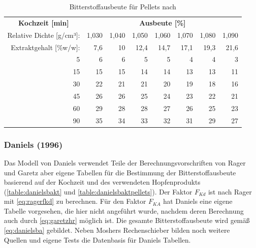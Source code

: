 \documentclass[a4paper,parskip=half]{scrartcl}
\newcommand{\FKd}{F_{\mathit{Kd}}}
\newcommand{\FHR}{F_{\mathit{KA}}}
\begin{document}
\begin{table}[H]
\centering
\begin{tabular}{rrrrrrrr} 
\toprule
\multicolumn{1}{c}{\textbf{Kochzeit [min]}} & \multicolumn{7}{c}{\textbf{Ausbeute [\%]}}  \\
Relative Dichte [g/cm³]:                                        & 1,030 & 1,040 & 1,050 & 1,060 & 1,070 & 1,080  & 1,090                   \\
Extraktgehalt [\%w/w]:                                            & 7,6 & 10 & 12,4 & 14,7 & 17,1 & 19,3  & 21,6                   \\  
\midrule
5                                            & 6     & 6     & 5     & 5     & 4     & 4      & 3                          \\
15                                           & 15    & 15    & 14    & 14    & 13    & 13     & 11                         \\
30                                           & 22    & 21    & 21    & 20    & 19    & 18     & 16                         \\
45                                           & 26    & 26    & 25    & 24    & 23    & 22     & 21                         \\
60                                           & 29    & 28    & 28    & 27    & 26    & 25     & 23                         \\
90                                           & 35    & 34    & 33    & 32    & 31    & 29     & 27                         \\
\bottomrule
\end{tabular}
\caption{Bitterstoffausbeute für Pellets nach \citeauthor{Mosher1994} \parencite[51]{Holle2010}}
\label{table:mosherbaktpellets}
\end{table}

\subsubsection*{Daniels (1996)}

Das Modell von Daniels verwendet Teile der Berechnungsvorschriften von Rager und Garetz aber eigene Tabellen für die Bestimmung der Bitterstoffausbeute basierend auf der Kochzeit und des verwendeten Hopfenprodukts (\autoref{table:danielsbakt} und \autoref{table:danielsbaktpellets}). Der Faktor $\FKd$ ist nach Rager mit \autoref{eq:ragerfkd} zu berechnen. Für den Faktor $\FHR$ hat Daniels eine eigene Tabelle vorgesehen, die hier nicht angeführt wurde, nachdem deren Berechnung auch durch \autoref{eq:garetzhr} möglich ist. Die gesamte Bitterstoffausbeute wird gemäß \autoref{eq:danielsba} gebildet. Neben Moshers Rechenschieber bilden noch weitere Quellen und eigene Tests die Datenbasis für Daniels Tabellen. \parencite[80,85-88]{Daniels1996}
\end{document}
